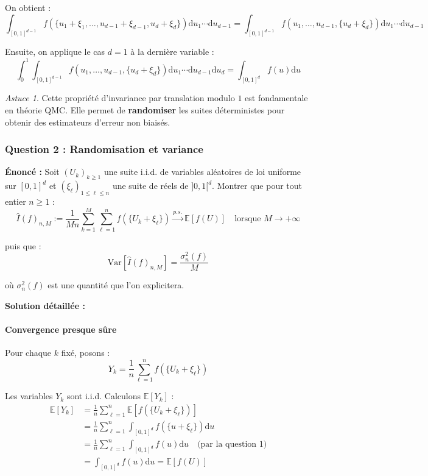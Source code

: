 \documentclass[12pt,a4paper]{article}
\theoremstyle{definition}
\theoremstyle{remark}
\newtheorem*{astuce}{Astuce}
\newcommand{\E}{\mathbb{E}}
\newcommand{\Var}{\text{Var}}
\newcommand{\dd}{\mathrm{d}}
\begin{document}
On obtient :
\[
\int_{[0,1]^{d-1}} f(\{u_1 + \xi_1, \ldots, u_{d-1} + \xi_{d-1}, u_d + \xi_d\})\dd u_1 \cdots \dd u_{d-1} = \int_{[0,1]^{d-1}} f(u_1, \ldots, u_{d-1}, \{u_d + \xi_d\})\dd u_1 \cdots \dd u_{d-1}
\]

Ensuite, on applique le cas $d=1$ à la dernière variable :
\[
\int_0^1 \int_{[0,1]^{d-1}} f(u_1, \ldots, u_{d-1}, \{u_d + \xi_d\})\dd u_1 \cdots \dd u_{d-1}\dd u_d = \int_{[0,1]^d} f(u)\dd u
\]

\begin{astuce}
Cette propriété d'invariance par translation modulo $1$ est fondamentale en théorie QMC. Elle permet de \textbf{randomiser} les suites déterministes pour obtenir des estimateurs d'erreur non biaisés.
\end{astuce}

\subsubsection{Question 2 : Randomisation et variance}

\textbf{Énoncé :} Soit $(U_k)_{k \geq 1}$ une suite i.i.d. de variables aléatoires de loi uniforme sur $[0,1]^d$ et $(\xi_\ell)_{1 \leq \ell \leq n}$ une suite de réels de $]0,1[^d$. Montrer que pour tout entier $n \geq 1$ :
\[
\hat{I}(f)_{n,M} := \frac{1}{Mn}\sum_{k=1}^M \sum_{\ell=1}^n f(\{U_k + \xi_\ell\}) \xrightarrow{p.s.} \E[f(U)] \quad \text{lorsque } M \to +\infty
\]

puis que :
\[
\Var[\hat{I}(f)_{n,M}] = \frac{\sigma_n^2(f)}{M}
\]

où $\sigma_n^2(f)$ est une quantité que l'on explicitera.

\textbf{Solution détaillée :}

\paragraph{Convergence presque sûre}

Pour chaque $k$ fixé, posons :
\[
Y_k = \frac{1}{n}\sum_{\ell=1}^n f(\{U_k + \xi_\ell\})
\]

Les variables $Y_k$ sont i.i.d. Calculons $\E[Y_k]$ :
\begin{align*}
\E[Y_k] &= \frac{1}{n}\sum_{\ell=1}^n \E[f(\{U_k + \xi_\ell\})] \\
&= \frac{1}{n}\sum_{\ell=1}^n \int_{[0,1]^d} f(\{u + \xi_\ell\})\dd u \\
&= \frac{1}{n}\sum_{\ell=1}^n \int_{[0,1]^d} f(u)\dd u \quad \text{(par la question 1)} \\
&= \int_{[0,1]^d} f(u)\dd u = \E[f(U)]
\end{align*}
\end{document}
